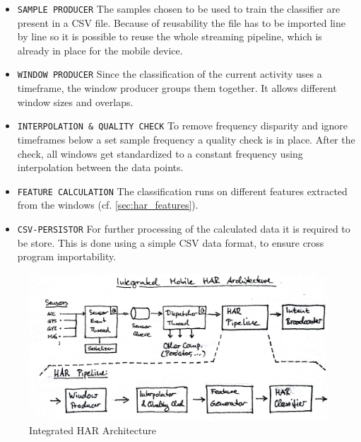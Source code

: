 \begin{itemize}
  \item \texttt{SAMPLE PRODUCER} The samples chosen to be used to train the 
    classifier are present in a CSV file. Because of reusability the file has 
    to be imported line by line so it is possible to reuse the whole streaming
    pipeline, which is already in place for the mobile device.
  \item \texttt{WINDOW PRODUCER} Since the classification of the current 
    activity uses a timeframe, the window producer groups them together. It
    allows different window sizes and overlaps.
  \item \texttt{INTERPOLATION \& QUALITY CHECK} To remove frequency disparity 
    and ignore timeframes below a set sample frequency a quality check is in 
    place. After the check, all windows get standardized to a constant frequency
    using interpolation between the data points.
  \item \texttt{FEATURE CALCULATION} The classification runs on different 
    features extracted from the windows (cf. \ref{sec:har_features}).
  \item \texttt{CSV-PERSISTOR} For further processing of the calculated data
    it is required to be store. This is done using a simple CSV data format,
    to ensure cross program importability.
\end{itemize}

\begin{figure}[htbp]
\centering
\includegraphics[width=\textwidth]{img/har/integration.jpg}
\caption{Integrated HAR Architecture}\label{fig:integrated_har}
\end{figure}

